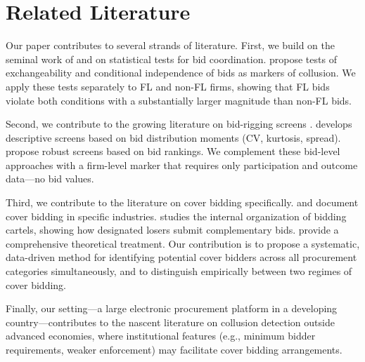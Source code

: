 \documentclass[12pt]{elsarticle}
\begin{document}
\section{Related Literature}
\label{sec:literature}

Our paper contributes to several strands of literature. First, we build on the seminal work of \citet{bajari2003deciding} and \citet{porter1993detection} on statistical tests for bid coordination. \citet{bajari2003deciding} propose tests of exchangeability and conditional independence of bids as markers of collusion. We apply these tests separately to FL and non-FL firms, showing that FL bids violate both conditions with a substantially larger magnitude than non-FL bids.

Second, we contribute to the growing literature on bid-rigging screens \citep{imhof2019detecting, imhof2018screening, abrantesmetz2006a, hüschelrath2014cartel, chassang2022robust}. \citet{imhof2019detecting} develops descriptive screens based on bid distribution moments (CV, kurtosis, spread). \citet{chassang2022robust} propose robust screens based on bid rankings. We complement these bid-level approaches with a firm-level marker that requires only participation and outcome data---no bid values.

Third, we contribute to the literature on cover bidding specifically. \citet{porter1999ohio} and \citet{pesendorfer2000study} document cover bidding in specific industries. \citet{asker2010leniency} studies the internal organization of bidding cartels, showing how designated losers submit complementary bids. \citet{marshall2012economics} provide a comprehensive theoretical treatment. Our contribution is to propose a systematic, data-driven method for identifying potential cover bidders across all procurement categories simultaneously, and to distinguish empirically between two regimes of cover bidding.

Finally, our setting---a large electronic procurement platform in a developing country---contributes to the nascent literature on collusion detection outside advanced economies, where institutional features (e.g., minimum bidder requirements, weaker enforcement) may facilitate cover bidding arrangements.

\end{document}
